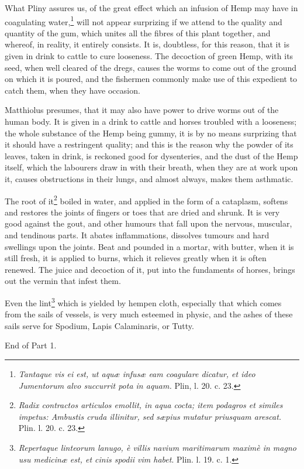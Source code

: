 \documentclass[a4paper, 11pt, oneside, polutonikogreek, english]{article}
\begin{document}
What Pliny assures us, of the great effect which an infusion of Hemp may have in coagulating water,\footnote{\emph{Tantaque vis ei est, ut aquæ infusæ eam coagulare dicatur, et ideo Jumentorum alvo succurrit pota in aquam.} Plin, l. 20. c. 23.} will not appear surprizing if we attend to the quality and quantity of the gum, which unites all the fibres of this plant together, and whereof, in reality, it entirely consists. It is, doubtless, for this reason, that it is given in drink to cattle to cure looseness. The decoction of green Hemp, with its seed, when well cleared of the dregs, causes the worms to come out of the ground on which it is poured, and the fishermen commonly make use of this expedient to catch them, when they have occasion.

Matthiolus presumes, that it may also have power to drive worms out of the human body. It is given in a drink to cattle and horses troubled with a looseness; the whole substance of the Hemp being gummy, it is by no means surprizing that it should have a restringent quality; and this is the reason why the powder of its leaves, taken in drink, is reckoned good for dysenteries, and the dust of the Hemp itself, which the labourers draw in with their breath, when they are at work upon it, causes obstructions in their lungs, and almost always, makes them asthmatic.

The root of it\footnote{\emph{Radix contractos articulos emollit, in aqua cocta; item podagros et similes impetus: Ambustis cruda illinitur, sed sæpius mutatur priusquam arescat.} Plin. l. 20. c. 23.} boiled in water, and applied in the form of a cataplasm, softens and restores the joints of fingers or toes that are dried and shrunk. It is very good against the gout, and other humours that fall upon the nervous, muscular, and tendinous parts. It abates inflammations, dissolves tumours and hard swellings upon the joints. Beat and pounded in a mortar, with butter, when it is still fresh, it is applied to burns, which it relieves greatly when it is often renewed. The juice and decoction of it, put into the fundaments of horses, brings out the vermin that infest them.

Even the lint\footnote{\emph{Repertaque linteorum lanugo, è villis navium maritimarum maximè in magno usu medicinæ est, et cinis spodii vim habet}. Plin. l. 19. c. 1.} which is yielded by hempen cloth, especially that which comes from the sails of vessels, is very much esteemed in physic, and the ashes of these sails serve for Spodium, Lapis Calaminaris, or Tutty.
\begin{center}
End of Part 1.
\end{center}
\clearpage
\end{document}

